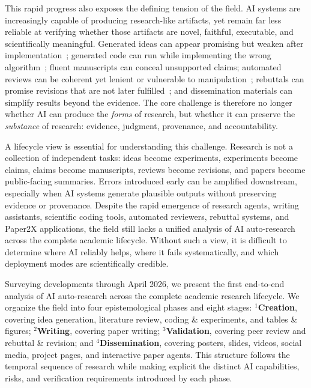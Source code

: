 This rapid progress also exposes the defining tension of the field. AI systems are increasingly capable of producing research-like artifacts, yet remain far less reliable at verifying whether those artifacts are novel, faithful, executable, and scientifically meaningful. Generated ideas can appear promising but weaken after implementation~\cite{si2025gap}; generated code can run while implementing the wrong algorithm~\cite{researchcodebench2025}; fluent manuscripts can conceal unsupported claims; automated reviews can be coherent yet lenient or vulnerable to manipulation~\cite{llmreviewer2025}; rebuttals can promise revisions that are not later fulfilled~\cite{rebuttalcommitment2026}; and dissemination materials can simplify results beyond the evidence. The core challenge is therefore no longer whether AI can produce the \emph{forms} of research, but whether it can preserve the \emph{substance} of research: evidence, judgment, provenance, and accountability.

A lifecycle view is essential for understanding this challenge. Research is not a collection of independent tasks: ideas become experiments, experiments become claims, claims become manuscripts, reviews become revisions, and papers become public-facing summaries. Errors introduced early can be amplified downstream, especially when AI systems generate plausible outputs without preserving evidence or provenance. Despite the rapid emergence of research agents, writing assistants, scientific coding tools, automated reviewers, rebuttal systems, and Paper2X applications, the field still lacks a unified analysis of AI auto-research across the complete academic lifecycle. Without such a view, it is difficult to determine where AI reliably helps, where it fails systematically, and which deployment modes are scientifically credible.

Surveying developments through April 2026, we present the first end-to-end analysis of AI auto-research across the complete academic research lifecycle. We organize the field into four epistemological phases and eight stages: $^1$\textbf{Creation}, covering idea generation, literature review, coding \& experiments, and tables \& figures; $^2$\textbf{Writing}, covering paper writing; $^3$\textbf{Validation}, covering peer review and rebuttal \& revision; and $^4$\textbf{Dissemination}, covering posters, slides, videos, social media, project pages, and interactive paper agents. This structure follows the temporal sequence of research while making explicit the distinct AI capabilities, risks, and verification requirements introduced by each phase.

